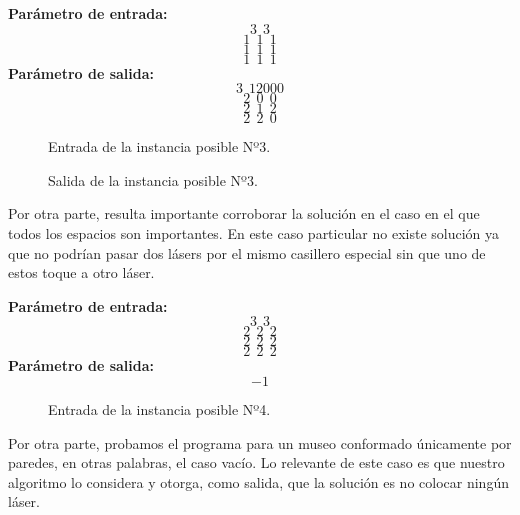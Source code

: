 \begin{itemize}
\textbf{Parámetro de entrada:} 
$$3\ \ 3$$
$$1\ \ 1\ \ 1$$
$$1\ \ 1\ \ 1$$
$$1\ \ 1\ \ 1$$
\textbf{Parámetro de salida:} 
$$3\ \ 12000$$
$$2\ \ 0\ \ 0$$
$$2\ \ 1\ \ 2$$
$$2\ \ 2\ \ 0$$
\newline

\begin{figure}[H] %
\hfill
\begin{minipage}[t]{.45\textwidth}
\begin{center}
\caption{Entrada de la instancia posible Nº3.}
\label{fig-tc1}
\end{center}
\end{minipage}
\hfill
\begin{minipage}[t]{.45\textwidth}
\begin{center}
\caption{Salida de la instancia posible Nº3.}
\label{fig-tc2}
\end{center}
\end{minipage}
\hfill
\end{figure}

\item Por otra parte, resulta importante corroborar la solución en el caso en el que todos los espacios son importantes. En este caso particular no existe solución ya que no podrían pasar dos lásers por el mismo casillero especial sin que uno de estos toque a otro láser.\newline

\textbf{Parámetro de entrada:} 
$$3\ \ 3$$
$$2\ \ 2\ \ 2$$
$$2\ \ 2\ \ 2$$
$$2\ \ 2\ \ 2$$
\textbf{Parámetro de salida:} $$-1$$\newline

\begin{center}
\begin{figure}[H] %
\begin{minipage}[t]{.45\textwidth}
\begin{center}
\caption{Entrada de la instancia posible Nº4.}
\end{center}
\label{fig-tc1}
\end{minipage}
\end{figure}
\item Por otra parte, probamos el programa para un museo conformado únicamente por paredes, en otras palabras, el caso vacío. Lo relevante de este caso es que nuestro algoritmo lo considera y otorga, como salida, que la solución es no colocar ningún láser.\newline
\end{center}


\end{itemize}
